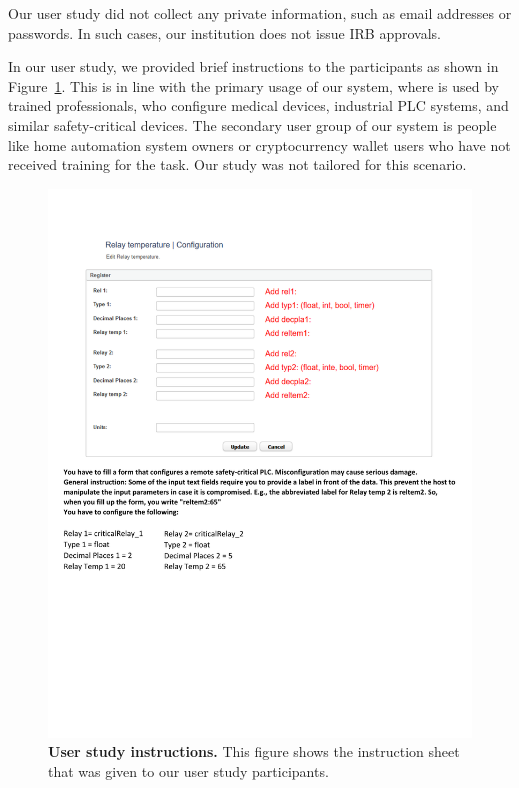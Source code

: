  Our user study did not collect any private information, such as email addresses or passwords. In such cases, our institution does not issue IRB approvals.

 In our user study, we provided brief instructions to the participants as shown in Figure~\ref{fig:userStudyInstruction}. This is in line with the primary usage of our system, where \name is used by trained professionals, who configure medical devices, industrial PLC systems, and similar safety-critical devices. The secondary user group of our system is people like home automation system owners or cryptocurrency wallet users who have not received training for the task. Our study was not tailored for this scenario.


\begin{figure}[t]
 \centering
 \includegraphics[trim={0 8cm 0 2cm}, clip,width=\linewidth]{chapters/IntegriKey/images/userStudy.pdf}
 \caption[User study instructions]{\textbf{User study instructions.} This figure shows the instruction sheet that was given to our user study participants.}
 \label{fig:userStudyInstruction}
\end{figure}

